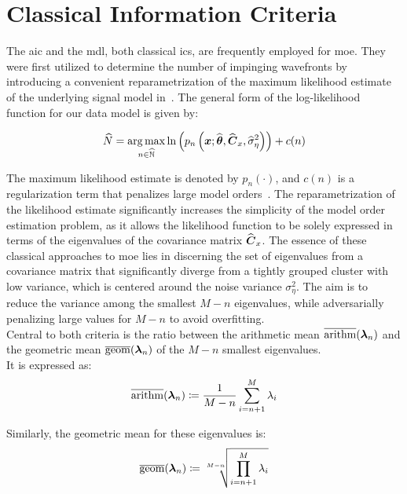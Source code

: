 \section{Classical Information Criteria}
\label{sec:ClassicalInformationCriteria}
The \gls{aic} and the \gls{mdl}, both classical \glspl{ic},
are frequently employed for \gls{moe}. They were first utilized to determine the number of impinging wavefronts by introducing
a convenient reparametrization of the maximum likelihood estimate of the underlying signal model in~\cite{mdlAndAic}.
The general form of the log-likelihood function for our data model is given by:

\begin{equation}
    \widehat{N}=\underset{n \in \widehat{\mathbb{N}}}{\operatorname*{arg\,max}} \ln \left(p_{n}\left(\boldsymbol{x} ; \widehat{\boldsymbol{\theta}}, \widehat{\boldsymbol{C}}_x, \widehat{\sigma}_\eta^2\right)\right)+ c(n)
    \label{eq:max_likelihood}
\end{equation}

The maximum likelihood estimate is denoted by \( p_{n}(\cdot) \), and \( c(n) \) is a regularization term that penalizes
large model orders~\cite{barthelme21sub}.
The reparametrization of the likelihood estimate significantly increases the simplicity of the
model order estimation problem, as it allows the likelihood function to be solely expressed in terms of the eigenvalues of the
covariance matrix \( \widehat{\boldsymbol{C}}_x \).
The essence of these classical approaches to \gls{moe} lies in discerning the set of eigenvalues from a covariance matrix that significantly diverge
from a tightly grouped cluster with low variance, which is centered around the noise variance \( \sigma^2_{\eta} \).
The aim is to reduce the variance among the smallest \( M - n \) eigenvalues, while adversarially penalizing large
values for \( M - n \) to avoid overfitting.\\


Central to both criteria is the ratio between the arithmetic mean \( \overline{\operatorname{arithm}}(\boldsymbol{\lambda}_n) \) and the geometric mean
\( \overline{\operatorname{geom}}(\boldsymbol{\lambda}_n) \) of the \( M - n \) smallest eigenvalues.\\
It is expressed as:
\begin{equation}
    \overline{\operatorname{arithm}}(\boldsymbol{\lambda}_n) \coloneqq \frac{1}{M-n} \sum_{i=n+1}^{M} \lambda_i
\end{equation}

Similarly, the geometric mean for these eigenvalues is:
\begin{equation}
    \overline{\operatorname{geom}}(\boldsymbol{\lambda}_n) \coloneqq \sqrt[M-n]{\prod_{i=n+1}^{M} \lambda_i}
\end{equation} %

